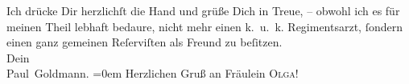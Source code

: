 \pstart
           Ich drücke Dir herzlichſt die  Hand und grüße Dich in Treue, – obwohl ich es für meinen Theil lebhaft
               bedaure, {\pb}nicht mehr einen k. u. k. Regimentsarzt,{ }ſondern einen ganz gemeinen Reſerviſten als Freund zu beſitzen. {\\[\baselineskip]}Dein {\\[\baselineskip]}\spacefill\mbox{Paul Goldmann.}\pend
           \leftskip=0em{}
\pstart
           \noindent{}Herzlichen Gruß an Fräulein \textsc{Olga}!\pend
           \endnumbering{}  \newcommand{\dateiname}{L03070}\newcommand{\titel}{Paul Goldmann an Arthur Schnitzler, 21. 6. [1901]}\newcommand{\editorInnen}{Martin Anton Müller und Laura Untner}
